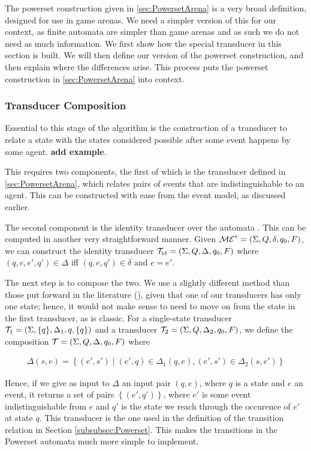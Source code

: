 \documentclass[12pt, a4paper]{article}
\begin{document}
The powerset construction given in \ref{sec:PowersetArena} is a very broad
definition, designed for use in game arenas. We need a simpler version of this
for our context, as finite automata are simpler than game arenas and as such we
do not need as much information. We first show how the special transducer in
this section is built. We will then define our version of the powerset
construction, and then explain where the differences arise. This process puts
the powerset construction in \ref{sec:PowersetArena} into context.

\subsubsection{Transducer Composition}
\label{subsubsec:TransducerComposition}

Essential to this stage of the algorithm is the construction of a transducer to
relate a state with the states considered possible after some event happens by
some agent. \textbf{add example}.

This requires two components, the first of which is the transducer defined in
\ref{sec:PowersetArena}, which relates pairs of events that are
indistinguishable to an agent. This can be constructed with ease from the event
model, as discussed earlier.

The second component is the identity transducer over the automata \mestar. This
can be computed in another very straightforward manner. Given $\mathcal{ME}^\ast =
(\Sigma, Q, \delta, q_0, F)$, we can construct the identity transducer
$\mathcal{T}_{\text{id}} = (\Sigma, Q, \Delta, q_0, F)$ where $(q, e, e', q') \in
\Delta$ iff $(q, e, q') \in \delta$ and $e = e'$. 

The next step is to compose the two. We use a slightly different method than
those put forward in the literature (\cite{ComposingFSTs}), given that one of
our transducers has only one state; hence, it would not make sense to need to
move on from the state in the first transducer, as is classic. For a
single-state transducer $\mathcal{T}_1 = (\Sigma, \{q\}, \Delta_1, q, \{q\})$ and
a transducer $\mathcal{T}_2 = (\Sigma, Q, \Delta_2, q_0, F)$, we define the
composition $\mathcal{T} = (\Sigma, Q, \Delta, q_0, F)$ where 

\begin{align*}
  \Delta(s, e) = \left\{ (e', s') \mid (e', q) \in \Delta_1(q, e), (e', s') \in \Delta_2(s, e') \right\} 
\end{align*}

Hence, if we give as input to $\Delta$ an input pair $(q, e)$, where $q$ is a
state and $e$ an event, it returns a set of pairs $\left\{ (e', q') \right\}$,
where $e'$ is some event indistinguishable from $e$ and $q'$ is the state we
reach through the occurence of $e'$ at state $q$. This transducer is the one
used in the definition of the transition relation in Section
\ref{subsubsec:Powerset}. This makes the transitions in the Powerset automata
much more simple to implement. 
\end{document}
